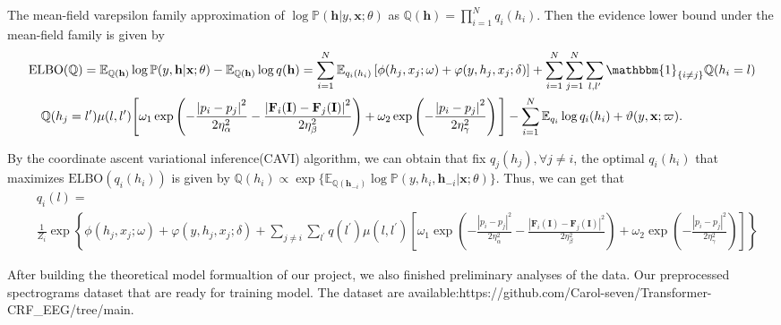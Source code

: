 \documentclass[10pt]{article}
\newcommand{\EE}{{\mathbb{E}}}
\newcommand{\PP}{{\mathbb{P}}}
\newcommand{\QQ}{{\mathbb{Q}}}
\newcommand{\Fb}{\mathbf{F}}
\newcommand{\Ib}{\mathbf{I}}
\newcommand{\hb}{\mathbf{h}}
\newcommand{\xb}{\mathbf{x}}
\newcommand{\one}{\mathbbm{1}}
\begin{document}
The mean-field varepsilon family approximation of
$\log\PP(\hb \vert y, \xb; \theta)$ as $\QQ(\hb) = \prod_{i=1}^N q_i(h_i)$.
Then the evidence lower bound under the mean-field family is given by
\begin{equation*}
\begin{split}
& \textrm{ELBO}(\QQ) = \EE_{\QQ(\hb)} \log\PP(y, \hb \vert \xb; \theta)
- \EE_{\QQ(\hb)} \log q(\hb) = \sum_{i=1}^N \EE_{q_i(h_i)}
\left[ \phi(h_j, x_j; \omega) + \varphi(y, h_j, x_j; \delta) \right]
+ \sum_{i=1}^N \sum_{j=1}^N \sum_{l,l^\prime} \one_{\{i \neq j\}}\QQ(h_i = l) \\
&\quad \QQ(h_j = l^\prime) \mu(l, l^\prime)
\Bigg[ \omega_1 \exp \left(
- \frac{\left\lvert p_i - p_j \right\rvert^2}{2\eta_\alpha^2}
- \frac{\left\lvert \Fb_i(\Ib) - \Fb_j(\Ib) \right\rvert^2}{2\eta_\beta^2}
\right)
+ \omega_2 \exp \left(
- \frac{\left\lvert p_i - p_j \right\rvert^2}{2\eta_\gamma^2}
\right) \Bigg]
- \sum_{i=1}^N \EE_{q_i} \log q_i(h_i) + \vartheta(y, \xb; \varpi).
\end{split}
\end{equation*}


By the coordinate ascent variational inference(CAVI) algorithm,
we can obtain that fix $q_j(h_j), \forall j \neq i$, the optimal $q_i(h_i)$
that maximizes $\textrm{ELBO}(q_i(h_i))$ is given by
$\QQ(h_i) \propto \exp\{\EE_{\QQ(\hb_{-i})}
\log\PP(y, h_i, \hb_{-i} \vert \xb; \theta)\}$.
Thus, we can get that
\begin{equation*}
\begin{aligned}
& q_i(l) = \\
&\frac{1}{Z_i} \exp \left\{
\phi(h_j, x_j; \omega) + \varphi(y, h_j, x_j; \delta)
+ \sum_{j \neq i} \sum_{l^\prime} q(l^\prime) \mu(l, l^\prime) 
\left[ \omega_1 \exp \left(
- \frac{\left\lvert p_i - p_j \right\rvert^2}{2\eta_\alpha^2}
- \frac{\left\lvert \Fb_i(\Ib) - \Fb_j(\Ib) \right\rvert^2}{2\eta_\beta^2}
\right)
+ \omega_2 \exp \left(
- \frac{\left\lvert p_i - p_j 
\right\rvert^2}{2\eta_\gamma^2}
\right)
\right]
\right\}
\end{aligned}
\end{equation*}


After building the theoretical model formualtion of our project, we also finished 
 preliminary analyses of the data.
Our preprocessed spectrograms dataset that are ready for training model.
The dataset are available:{https://github.com/Carol-seven/Transformer-CRF\_EEG/tree/main}.
\end{document}
